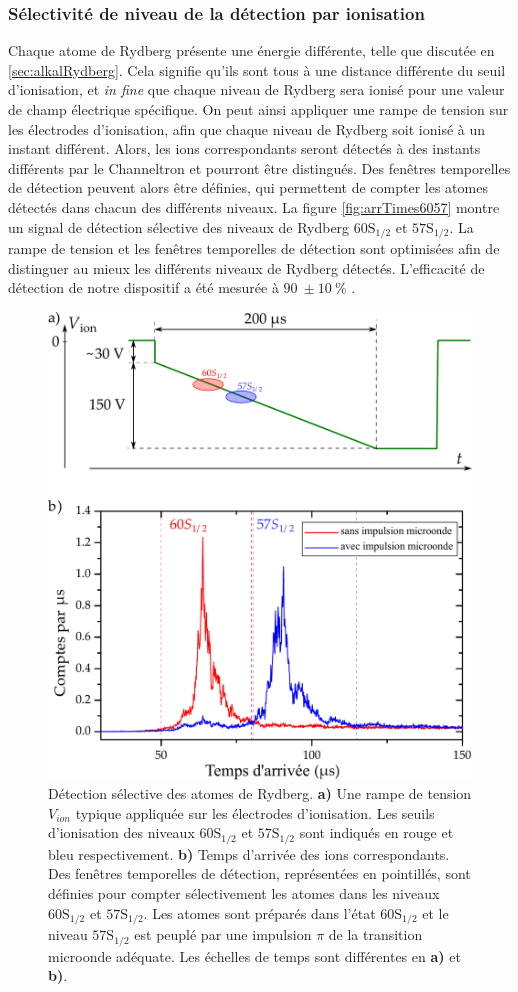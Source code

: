 \subsubsection*{Sélectivité de niveau de la détection par ionisation}
\noindent Chaque atome de Rydberg présente une énergie différente, telle que discutée en \ref{sec:alkalRydberg}.
Cela signifie qu'ils sont tous à une distance différente du seuil d'ionisation, et \textit{in fine} que chaque niveau de Rydberg sera ionisé pour une valeur de champ électrique spécifique.
On peut ainsi appliquer une rampe de tension sur les électrodes d'ionisation, afin que chaque niveau de Rydberg soit ionisé à un instant différent.
Alors, les ions correspondants seront détectés à des instants différents par le Channeltron et pourront être distingués.
Des fenêtres temporelles de détection peuvent alors être définies, qui permettent de compter les atomes détectés dans chacun des différents niveaux.
La figure \eqref{fig:arrTimes6057} montre un signal de détection sélective des niveaux de Rydberg $\mathrm{60S_{1/2}}$ et $\mathrm{57S_{1/2}}$.
La rampe de tension et les fenêtres temporelles de détection sont optimisées afin de distinguer au mieux les différents niveaux de Rydberg détectés.
L'efficacité de détection de notre dispositif a été mesurée à $\SI{90}{} \pm \SI{10}{\percent}$ \cite{PHD_CELISTRINO}.
%
\begin{figure}[!h]
\centering
\includegraphics[width=.7\linewidth]{figures/setup/rydberg/arrTimes6057}
\caption[Détection sélective des niveaux $\mathrm{60S_{1/2}}$ et $\mathrm{57S_{1/2}}$]{
Détection sélective des atomes de Rydberg.
\textbf{a)} Une rampe de tension $V_{ion}$ typique appliquée sur les électrodes d'ionisation.
Les seuils d'ionisation des niveaux $\mathrm{60S_{1/2}}$ et $\mathrm{57S_{1/2}}$ sont indiqués en rouge et bleu respectivement.
\textbf{b)} Temps d'arrivée des ions correspondants. Des fenêtres temporelles de détection, représentées en pointillés, sont définies pour compter sélectivement les atomes dans les niveaux $\mathrm{60S_{1/2}}$ et $\mathrm{57S_{1/2}}$.
Les atomes sont préparés dans l'état $\mathrm{60S_{1/2}}$ et le niveau $\mathrm{57S_{1/2}}$ est peuplé par une impulsion $\pi$ de la transition microonde adéquate.
Les échelles de temps sont différentes en \textbf{a)} et \textbf{b)}.
}
\label{fig:arrTimes6057}
\end{figure}
